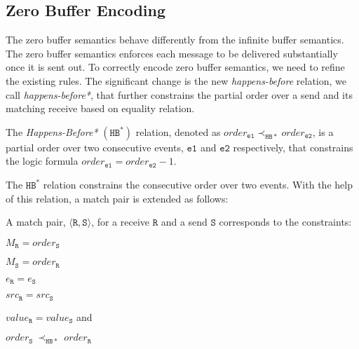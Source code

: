 





\subsection{Zero Buffer Encoding}
The zero buffer semantics behave differently from the infinite buffer semantics.  The zero buffer semantics enforces each message to be delivered substantially once it is sent out. To correctly encode zero buffer semantics, we need to refine the existing rules. The significant change is the new \emph{happens-before} relation, we call \textit{happens-before*}, that further constrains the partial order over a send and its matching receive based on equality relation. 

\begin{definition}
The \emph{Happens-Before*} $(\mathtt{HB^*})$ relation, denoted as
$\mathit{order}_\mathtt{e1} \mathrm{\prec_\mathtt{HB*}} \mathit{order}_\mathtt{e2}$, is a partial order over two consecutive events, $\mathtt{e1}$ and $\mathtt{e2}$ respectively, that constrains the logic formula $\mathit{order}_\mathtt{e1} =  \mathit{order}_\mathtt{e2} - 1$.
\label{def:hb*}
\end{definition}

The $\mathtt{HB^*}$ relation constrains the consecutive order over two events. With the help of this relation, a match pair is extended as follows: 

\begin{definition} \label{def:match*}
A match pair, $\langle\mathtt{R}, \mathtt{S}\rangle$, for a receive
$\mathtt{R}$ and a send $\mathtt{S}$ corresponds to the constraints:
\begin{compactenum}
\item $M_{\mathtt{R}} = \mathit{order}_{\mathtt{S}}$
\item $M_{\mathtt{S}} = \mathit{order}_{\mathtt{R}}$
\item $e_{\mathtt{R}} = e_{\mathtt{S}}$
\item $src_\mathtt{R} = src_\mathtt{S}$
\item $\mathit{value}_{\mathtt{R}} = \mathit{value}_{\mathtt{S}}$ and
\item $\mathit{order}_{\mathtt{S}}\ \mathrm{\prec_\mathtt{HB*}}\ \mathit{order}_{\mathtt{R}}$
\end{compactenum}
\end{definition}

